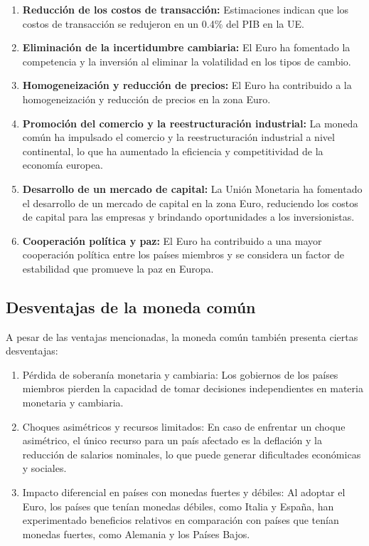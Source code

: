 \documentclass[
  letterpaper,
  DIV=11,
  numbers=noendperiod]{scrartcl}
\begin{document}
\begin{enumerate}
\def\labelenumi{\arabic{enumi}.}
\item
  \textbf{Reducción de los costos de transacción:} Estimaciones indican
  que los costos de transacción se redujeron en un 0.4\% del PIB en la
  UE.
\item
  \textbf{Eliminación de la incertidumbre cambiaria:} El Euro ha
  fomentado la competencia y la inversión al eliminar la volatilidad en
  los tipos de cambio.
\item
  \textbf{Homogeneización y reducción de precios:} El Euro ha
  contribuido a la homogeneización y reducción de precios en la zona
  Euro.
\item
  \textbf{Promoción del comercio y la reestructuración industrial:} La
  moneda común ha impulsado el comercio y la reestructuración industrial
  a nivel continental, lo que ha aumentado la eficiencia y
  competitividad de la economía europea.
\item
  \textbf{Desarrollo de un mercado de capital:} La Unión Monetaria ha
  fomentado el desarrollo de un mercado de capital en la zona Euro,
  reduciendo los costos de capital para las empresas y brindando
  oportunidades a los inversionistas.
\item
  \textbf{Cooperación política y paz:} El Euro ha contribuido a una
  mayor cooperación política entre los países miembros y se considera un
  factor de estabilidad que promueve la paz en Europa.
\end{enumerate}

\hypertarget{desventajas-de-la-moneda-comuxfan}{%
\subsection{Desventajas de la moneda
común}\label{desventajas-de-la-moneda-comuxfan}}

A pesar de las ventajas mencionadas, la moneda común también presenta
ciertas desventajas:

\begin{enumerate}
\def\labelenumi{\arabic{enumi}.}
\item
  Pérdida de soberanía monetaria y cambiaria: Los gobiernos de los
  países miembros pierden la capacidad de tomar decisiones
  independientes en materia monetaria y cambiaria.
\item
  Choques asimétricos y recursos limitados: En caso de enfrentar un
  choque asimétrico, el único recurso para un país afectado es la
  deflación y la reducción de salarios nominales, lo que puede generar
  dificultades económicas y sociales.
\item
  Impacto diferencial en países con monedas fuertes y débiles: Al
  adoptar el Euro, los países que tenían monedas débiles, como Italia y
  España, han experimentado beneficios relativos en comparación con
  países que tenían monedas fuertes, como Alemania y los Países Bajos.
\end{enumerate}
\end{document}
